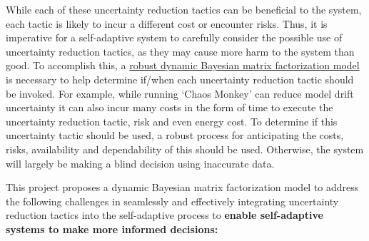 \documentclass[12pt]{article}
\newcommand{\dan}[1]{\textcolor{blue}{{\it [Dan says: #1]}}}
\begin{document}
While each of these uncertainty reduction tactics can be beneficial to the system, each tactic is likely to incur a different cost or encounter risks. Thus, it is imperative for a self-adaptive system to carefully consider the possible use of uncertainty reduction tactics, as they may cause more harm to the system than good. To accomplish this, a \ul{robust dynamic Bayesian matrix factorization model} is necessary to help determine if/when each uncertainty reduction tactic should be invoked. For example, while running `Chaos Monkey' can reduce model drift uncertainty it can also incur many costs in the form of time to execute the uncertainty reduction tactic, risk and even energy cost. To determine if this uncertainty tactic should be used, a robust process for anticipating the costs, risks, availability and dependability of this should be used. Otherwise, the system will largely be making a blind decision using inaccurate data. %





\vspace{1mm}
This project proposes a dynamic Bayesian matrix factorization model to address the following challenges in seamlessly and effectively integrating uncertainty reduction tactics into the self-adaptive process to \textbf{enable self-adaptive systems to make more informed decisions:} 
\end{document}

